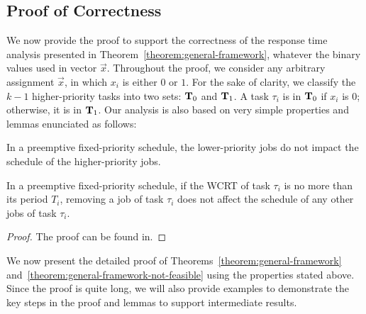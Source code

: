 \subsection{Proof of Correctness}  
\label{sec:proof-th1}

We now provide the proof to support the correctness of the response time analysis presented in
Theorem~\ref{theorem:general-framework}, whatever the binary values
used in vector $\vec{x}$.  %
Throughout the proof, we consider any arbitrary assignment
$\vec{x}$, in which $x_i$ is either $0$ or $1$. For the sake of clarity, we classify the $k-1$
higher-priority tasks into two sets: ${\bf T}_0$ and ${\bf T}_1$. A
task $\tau_i$ is in ${\bf T}_0$ if $x_i$ is $0$; otherwise, it is in
${\bf T}_1$.
Our analysis is also based on very simple properties and lemmas enunciated as follows:

\begin{Property}
\label{prop:lower-priority}
In a preemptive fixed-priority schedule, the lower-priority jobs do not impact the schedule of the higher-priority jobs.
\end{Property}


\begin{Lemma}
\label{lemma:remove-same-task}
In a preemptive fixed-priority schedule, if the WCRT of task $\tau_i$ is no more than its period $T_i$, removing a job of task $\tau_i$ does not affect the schedule of any other jobs of task $\tau_i$.
\end{Lemma}
\begin{proof}
The proof can be found in\citetechreport{}.
\end{proof}


We now present the detailed proof of
Theorems~\ref{theorem:general-framework} and~\ref{theorem:general-framework-not-feasible} using the properties stated above. Since the proof is quite long, we 
will also provide examples to demonstrate the key steps in the proof and lemmas to support intermediate results.

